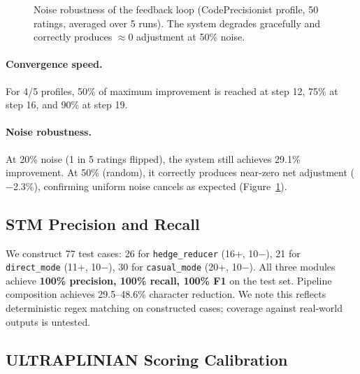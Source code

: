 \documentclass[11pt]{article}
\begin{document}
\begin{figure}[t]
\centering
{}
\caption{Noise robustness of the feedback loop (CodePrecisionist profile, 50 ratings, averaged over 5 runs). The system degrades gracefully and correctly produces ${\approx}0$ adjustment at 50\% noise.}
\label{fig:noise}
\end{figure}

\paragraph{Convergence speed.} For 4/5 profiles, 50\% of maximum improvement is reached at step 12, 75\% at step 16, and 90\% at step 19.

\paragraph{Noise robustness.} At 20\% noise (1 in 5 ratings flipped), the system still achieves 29.1\% improvement. At 50\% (random), it correctly produces near-zero net adjustment ($-$2.3\%), confirming uniform noise cancels as expected (Figure~\ref{fig:noise}).

\subsection{STM Precision and Recall}

We construct 77 test cases: 26 for \texttt{hedge\_reducer} (16+, 10$-$), 21 for \texttt{direct\_mode} (11+, 10$-$), 30 for \texttt{casual\_mode} (20+, 10$-$). All three modules achieve \textbf{100\% precision, 100\% recall, 100\% F1} on the test set. Pipeline composition achieves 29.5--48.6\% character reduction. We note this reflects deterministic regex matching on constructed cases; coverage against real-world outputs is untested.

\subsection{ULTRAPLINIAN Scoring Calibration}
\end{document}
